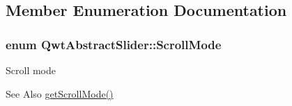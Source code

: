 \subsection{Member Enumeration Documentation}
\hypertarget{class_qwt_abstract_slider_ae4c0c4844ac6a35356f3c529a8eae154}{
\subsubsection[{Scroll\-Mode}]{\setlength{\rightskip}{0pt plus 5cm}enum {\bf Qwt\-Abstract\-Slider\-::\-Scroll\-Mode}}}\label{class_qwt_abstract_slider_ae4c0c4844ac6a35356f3c529a8eae154}
Scroll mode \begin{DoxySeeAlso}{See Also}
\hyperlink{class_qwt_abstract_slider_a4124aa3b1e462d57ea2693214e66da0b}{get\-Scroll\-Mode()} 
\end{DoxySeeAlso}
